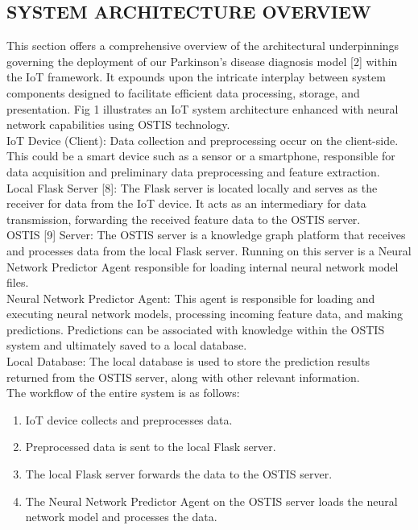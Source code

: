 \documentclass[10pt,two column]{article}
\begin{document}
\begin{SCn}
\section{\textbf{SYSTEM ARCHITECTURE OVERVIEW}}
\setlength{\parindent}{0.4cm}
This section offers a comprehensive overview of the
architectural underpinnings governing the deployment of
our Parkinson’s disease diagnosis model [2] within the
IoT framework. It expounds upon the intricate interplay
between system components designed to facilitate efficient data processing, storage, and presentation. Fig
1 illustrates an IoT system architecture enhanced with
neural network capabilities using OSTIS technology. \\
IoT Device (Client): Data collection and preprocessing
occur on the client-side. This could be a smart device
such as a sensor or a smartphone, responsible for data
acquisition and preliminary data preprocessing and feature extraction. \\
Local Flask Server [8]: The Flask server is located
locally and serves as the receiver for data from the IoT
device. It acts as an intermediary for data transmission,
forwarding the received feature data to the OSTIS server. \\
OSTIS [9] Server: The OSTIS server is a knowledge
graph platform that receives and processes data from the
local Flask server. Running on this server is a Neural
Network Predictor Agent responsible for loading internal
neural network model files. \\
Neural Network Predictor Agent: This agent is responsible for loading and executing neural network models,
processing incoming feature data, and making predictions. Predictions can be associated with knowledge
within the OSTIS system and ultimately saved to a local
database. \\
Local Database: The local database is used to store the
prediction results returned from the OSTIS server, along
with other relevant information. \\
The workflow of the entire system is as follows: \\
\begin{enumerate}[label=\arabic*)]
    \item IoT device collects and preprocesses data.
    \item Preprocessed data is sent to the local Flask server.
    \item The local Flask server forwards the data to the OSTIS server.
    \item The Neural Network Predictor Agent on the OSTIS server loads the neural network model and processes the data.

\end{enumerate}
\end{SCn}
\end{document}
